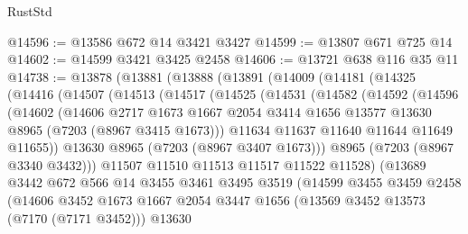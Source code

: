\begin{lexlean}{RustStd}
\begin{coremodule}
@14596 := @13586 @672 @14 @3421 @3427
@14599 := @13807 @671 @725 @14
@14602 := @14599 @3421 @3425 @2458
@14606 := @13721 @638 @116 @35 @11
@14738 := @13878
    (@13881
      (@13888
        (@13891
          (@14009
            (@14181
              (@14325
                (@14416
                  (@14507
                    (@14513
                      (@14517
                        (@14525
                          (@14531
                            (@14582
                              (@14592
                                (@14596
                                  (@14602
                                    (@14606
                                      @2717
                                      @1673
                                      @1667
                                      @2054
                                      @3414
                                      @1656
                                      @13577
                                      @13630
                                      @8965
                                      (@7203 (@8967 @3415 @1673)))
                                    @11634
                                    @11637
                                    @11640
                                    @11644
                                    @11649
                                    @11655))
                                @13630
                                @8965
                                (@7203 (@8967 @3407 @1673)))
                              @8965
                              (@7203 (@8967 @3340 @3432)))
                            @11507
                            @11510
                            @11513
                            @11517
                            @11522
                            @11528)
                          (@13689
                            @3442
                            @672
                            @566
                            @14
                            @3455
                            @3461
                            @3495
                            @3519
                            (@14599
                              @3455
                              @3459
                              @2458
                              (@14606
                                @3452
                                @1673
                                @1667
                                @2054
                                @3447
                                @1656
                                (@13569 @3452 @13573 (@7170 (@7171 @3452)))
                                @13630

\end{coremodule}
\end{lexlean}

